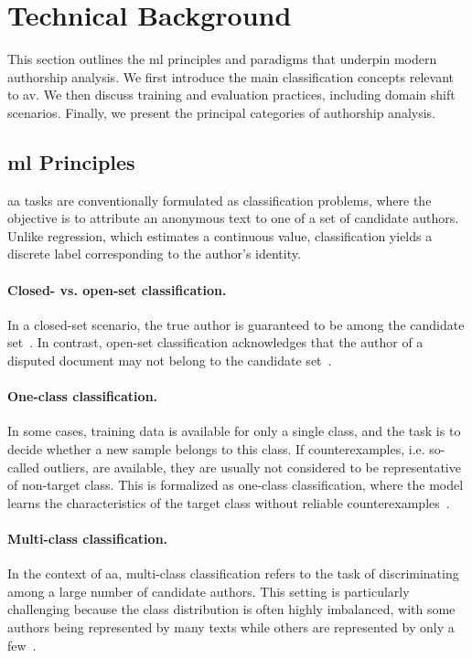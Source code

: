\section{Technical Background}

This section outlines the \acl{ml} principles and paradigms that underpin modern authorship analysis. 
We first introduce the main classification concepts relevant to \ac{av}. 
We then discuss training and evaluation practices, including domain shift scenarios. 
Finally, we present the principal categories of authorship analysis.

\subsection{\acl{ml} Principles}

\ac{aa} tasks are conventionally formulated as classification problems, where the objective is to attribute an anonymous text to one of a set of candidate authors. 
Unlike regression, which estimates a continuous value, classification yields a discrete label corresponding to the author’s identity.

\paragraph{Closed- vs. open-set classification.} 
In a closed-set scenario, the true author is guaranteed to be among the candidate set~\citep{koppel_authorship_2011}. 
In contrast, open-set classification acknowledges that the author of a disputed document may not belong to the candidate set~\citep{stamatatos_survey_2009}. 

\paragraph{One-class classification.} 
In some cases, training data is available for only a single class, and the task is to decide whether a new sample belongs to this class.
If counterexamples, i.e. so-called outliers, are available, they are usually not considered to be representative of non-target class. 
This is formalized as one-class classification, where the model learns the characteristics of the target class without reliable counterexamples~\citep{stein_intrinsic_2011,koppel_authorship_2004}.

\paragraph{Multi-class classification.} 
In the context of \ac{aa}, multi-class classification refers to the task of discriminating among a large number of candidate authors. 
This setting is particularly challenging because the class distribution is often highly imbalanced, with some authors being represented by many texts while others are represented by only a few~\citep{stamatatos_survey_2009,koppel_authorship_2004,elmanarelbouanani_authorship_2014}. 


